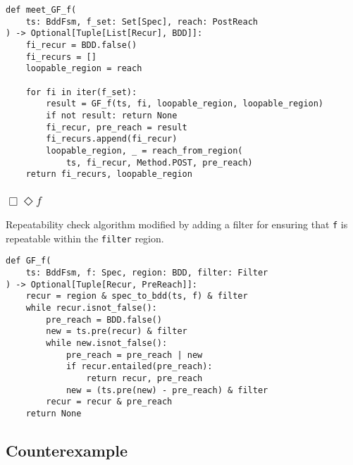 \documentclass[11pt]{article}
\newcommand{\minline}[1]{{\footnotesize \texttt{#1}}}
\begin{document}
\begin{verbatim}
def meet_GF_f(
    ts: BddFsm, f_set: Set[Spec], reach: PostReach
) -> Optional[Tuple[List[Recur], BDD]]:
    fi_recur = BDD.false()
    fi_recurs = []
    loopable_region = reach

    for fi in iter(f_set):
        result = GF_f(ts, fi, loopable_region, loopable_region)
        if not result: return None
        fi_recur, pre_reach = result
        fi_recurs.append(fi_recur)
        loopable_region, _ = reach_from_region(
            ts, fi_recur, Method.POST, pre_reach)
    return fi_recurs, loopable_region
\end{verbatim}

\subsubsection{$\Box\Diamond f$}

Repeatability check algorithm modified by adding a filter for ensuring that
\minline{f} is repeatable within the \minline{filter} region.

\begin{verbatim}
def GF_f(
    ts: BddFsm, f: Spec, region: BDD, filter: Filter
) -> Optional[Tuple[Recur, PreReach]]:
    recur = region & spec_to_bdd(ts, f) & filter
    while recur.isnot_false():
        pre_reach = BDD.false()
        new = ts.pre(recur) & filter
        while new.isnot_false():
            pre_reach = pre_reach | new
            if recur.entailed(pre_reach):
                return recur, pre_reach
            new = (ts.pre(new) - pre_reach) & filter
        recur = recur & pre_reach
    return None
\end{verbatim}

\subsection{Counterexample}
\end{document}
